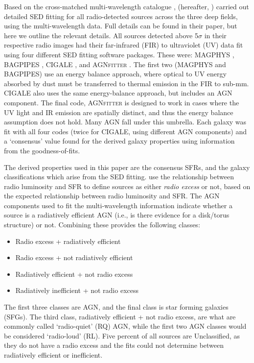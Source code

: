 \documentclass[usenatbib,fleqn,letters]{mnras}
\begin{document}
Based on the cross-matched multi-wavelength catalogue \cite{kondapally_lofar_2021}, \cite{best_lofar_2023} (hereafter, ) carried out detailed SED fitting for all radio-detected sources across the three deep fields, using the multi-wavelength data. Full details can be found in their paper, but here we outline the relevant details. All sources detected above 5$\sigma$ in their respective radio images had their far-infrared (FIR) to ultraviolet (UV) data fit using four different SED fitting software packages. These were: MAGPHYS \citep{da_cunha_simple_2008}, BAGPIPES \citep{carnall_inferring_2018,carnall_how_2019}, CIGALE \citep{burgarella_star_2005,noll_analysis_2009,boquien_cigale_2019}, and AGN\textsc{fitter} \citep{calistro_rivera_agnfitter_2016}. The first two (MAGPHYS and BAGPIPES) use an energy balance approach, where optical to UV energy absorbed by dust must be transferred to thermal emission in the FIR to sub-mm.  CIGALE also uses the same energy-balance approach, but includes an AGN component. The final code, AGN\textsc{fitter} is designed to work in cases where the UV light and IR emission are spatially distinct, and thus the energy balance assumption does not hold. Many AGN fall under this umbrella. Each galaxy was fit with all four codes (twice for CIGALE, using different AGN components) and a `consensus' value found for the derived galaxy properties using information from the goodness-of-fits.  

The derived properties used in this paper are the consensus SFRs, and the galaxy classifications which arise from the SED fitting.  use the relationship between radio luminosity and SFR to define sources as either \textit{radio excess} or not, based on the expected relationship between radio luminosity and SFR. The AGN components used to fit the multi-wavelength information indicate whether a source is a radiatively efficient AGN (i.e., is there evidence for a disk/torus structure) or not. Combining these provides the following classes:
\begin{itemize}
    \item Radio excess + radiatively efficient
    \item Radio excess + not radiatively efficient
    \item Radiatively efficient + not radio excess
    \item Radiatively inefficient + not radio excess
\end{itemize}
The first three classes are AGN, and the final class is star forming galaxies (SFGs). The third class, radiatively efficient + not radio excess, are what are commonly called `radio-quiet' (RQ) AGN, while the first two AGN classes would be considered `radio-loud' (RL).  Five percent of all sources are Unclassified, as they do not have a radio excess and the fits could not determine between radiatively efficient or inefficient. 
\end{document}
